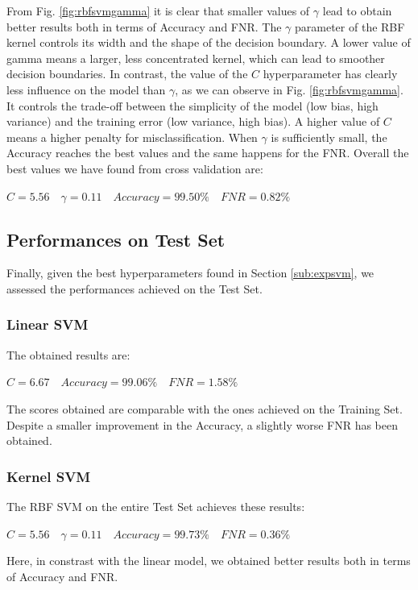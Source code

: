 \documentclass[twocolumn, switch]{article} %
\begin{document}
From Fig. \ref{fig:rbfsvmgamma} it is clear that smaller values of $\gamma$ lead to obtain better results both in terms of Accuracy and FNR. The $\gamma$ parameter of the RBF kernel controls its width and the shape of the decision boundary. A lower value of gamma means a larger, less concentrated kernel, which can lead to smoother decision boundaries.\newline
In contrast, the value of the $C$ hyperparameter has clearly less influence on the model than $\gamma$, as we can observe in Fig. \ref{fig:rbfsvmgamma}. It controls the trade-off between the simplicity of the model (low bias, high variance) and the training error (low variance, high bias). A higher value of $C$ means a higher penalty for misclassification.
When $\gamma$ is sufficiently small, the Accuracy reaches the best values and the same happens for the FNR.
Overall the best values we have found from cross validation are:
\begin{center}
	$C=5.56\quad\gamma=0.11 \quad Accuracy=99.50\% \quad FNR=0.82\%$
\end{center}

\subsection{Performances on Test Set}
Finally, given the best hyperparameters found in Section \ref{sub:expsvm}, we assessed the performances achieved on the Test Set.
\subsubsection{Linear SVM}
The obtained results are:
\begin{center}
	$C=6.67 \quad Accuracy=99.06\% \quad FNR=1.58\%$
\end{center}
The scores obtained are comparable with the ones achieved on the Training Set. Despite a smaller improvement in the Accuracy, a slightly worse FNR has been obtained.

\subsubsection{Kernel SVM}
The RBF SVM on the entire Test Set achieves these results:
\begin{center}
	$C=5.56 \quad \gamma=0.11 \quad Accuracy=99.73\% \quad FNR=0.36\%$
\end{center}
Here, in constrast with the linear model, we obtained better results both in terms of Accuracy and FNR.
\end{document}
